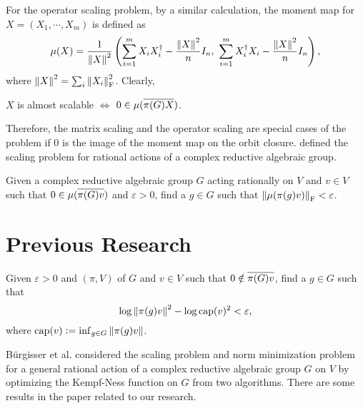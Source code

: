 \documentclass[suri,pdfbookmark]{engsuribt} %
\begin{document}
  For the operator scaling problem, by a similar calculation, the moment map for $X = (X_1,\cdots,X_m)$ is defined as
  \begin{equation*}
    \mu(X) = \frac{1}{\left\lVert X\right\lVert^2}\left(\sum_{i=1}^mX_iX_i^{\dagger} - \frac{\left\lVert X\right\lVert^2}{n}I_n,~\sum_{i=1}^mX_i^{\dagger}X_i-\frac{\left\lVert X\right\lVert^2}{n}I_n\right),
  \end{equation*}
  where $\left\lVert X\right\lVert^2 = \sum_i \left\lVert X_i\right\lVert_{\operatorname{F}}^2$. Clearly, 
  \begin{center}
    $X$ is almost scalable $\Leftrightarrow$ $0 \in \mu(\overline{\pi(G)X})$.
  \end{center}

  Therefore, the matrix scaling and the operator scaling are special cases of the problem if $0$ is the image of the moment map on the orbit closure. \cite{key8} defined the scaling problem for rational actions of a complex reductive algebraic group.
  \begin{prob}
    Given a complex reductive algebraic group $G$ acting rationally on $V$ and $v \in V$ such that $0 \in \mu(\overline{\pi(G)v})$ and $\varepsilon > 0$, find a $g \in G$ such that $\left\lVert\mu(\pi(g)v)\right\lVert_{\operatorname{F}} < \varepsilon$.
  \end{prob}

  \section{Previous Research}

  \begin{prob}
    Given $\varepsilon > 0$ and $(\pi,V)$ of $G$ and $v \in V$ such that $0 \notin \overline{\pi(G)v}$, find a $g \in G$ such that
    \begin{equation*}
      \log \left\lVert\pi(g)v\right\lVert^2 - \log \operatorname{cap}(v)^2 < \varepsilon,
    \end{equation*}
    where $\operatorname{cap}(v) \vcentcolon= \inf_{g \in G}\left\lVert\pi(g)v\right\lVert$.
  \end{prob}

  B{\"u}rgisser et al. \cite{key8} considered the scaling problem and norm minimization problem for a general rational action of a complex reductive algebraic group $G$ on $V$ by optimizing the Kempf-Ness function on $G$ from two algorithms. There are some results in the paper related to our research. 
\end{document}
